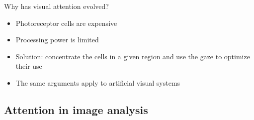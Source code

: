 \documentclass[xcolor=pdftex,dvipsnames,table,mathserif]{beamer}
\begin{document}
\begin{frame}{Why has visual attention evolved?}

  \begin{itemize}
  \item Photoreceptor cells are expensive
  \item Processing power is limited
  \item Solution: concentrate the cells in a given region and use the gaze to optimize their use
  \end{itemize}

\pause

  \begin{alertblock}{}
    \begin{itemize}
    \item The same arguments apply to artificial visual systems
    \end{itemize}
  \end{alertblock}

\end{frame}


\subsection{Attention in image analysis}
\end{document}
